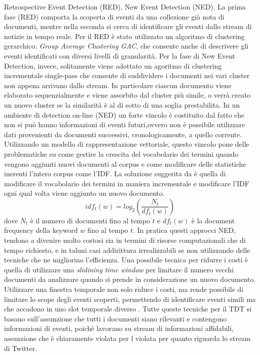 \documentclass[a4paper,12pt]{report}
\begin{document}
Retrospective Event Detection (RED), New Event Detection (NED). La prima fase (RED) comporta la scoperta di eventi da una collezione già nota di documenti, mentre nella seconda si cerca di identificare gli eventi dallo stream di notizie in tempo reale. Per il RED è stato utilizzato un algoritmo di clustering gerarchico: \emph{Group Average Clustering GAC}, che consente anche di descrivere gli eventi identificati con diversi livelli di granularità. Per la fase di New Event Detection, invece, solitamente viene adottato un agoritmo di clustering incrementale single-pass \cite{Allan:2002:TDT:772260,Yang:1998:SRO:290941.290953} che consente di suddividere i documenti nei vari cluster non appena arrivano dallo stream. In particolare ciascun documento viene elaborato sequenzialmente e viene assorbito dal cluster più simile, o verrà creato un nuovo cluster se la similarità è al di sotto di una soglia prestabilita. In un ambiente di detection on-line (NED) un forte vincolo è costituito dal fatto che non si può hanno informazioni di eventi futuri,ovvero non è possibile utilizzare dati provenienti da documenti successivi, cronologicamente, a quello corrente. Utilizzando un modello di rappresentazione vettoriale, questo vincolo pone delle problematiche su come gestire la crescita del vocabolario dei termini quando vengono aggiunti nuovi documenti al corpus e come modificare delle statistiche inerenti l'intero corpus come l'IDF. La soluzione suggerita da  \cite{Yang:1998:SRO:290941.290953} è quella di modificare il vocabolario dei termini in maniera incrementale e modificare l'IDF ogni qual volta viene aggiunto un nuovo documento. 
\begin{equation}
\label{eq:incIDF}
idf_t(w)=log_2 \left(\frac{N_t}{df_t(w)} \right) 
\end{equation}
dove $N_t$ è il numero di documenti fino al tempo $t$ e $df_t(w)$ è la document frequency della keyword $w$ fino al tempo $t$.
In pratica questi approcci NED, tendono a divenire molto costosi sia in termini di risorse computazionali che di tempo richiesto, e in taluni casi addirittura irrealizzabili se non utilizzando delle tecniche che ne migliorino l'efficienza. Una possibile tecnica per ridurre i costi è quella di utilizzare una \emph{slidining time window} \cite{Luo:2007:RRN:1247480.1247536,Papka:1999:ONE:897559} per limitare il numero vecchi documenti da analizzare quando si prende in considerazione un nuovo documento. Utilizzare una finestra temporale non solo riduce i costi, ma rende possibile di limitare lo scope degli eventi scoperti, permettendo di identificare eventi simili ma che accadono in uno slot temporale diverso \cite{Yang:1998:SRO:290941.290953}. Tutte queste tecniche per il TDT si basano sull'assunzione che tutti i documenti siano rilevanti e contengono informazioni di eventi, poichè lavorano su stream di informazioni affidabili,  assunzione che è chiaramente violata per l violata per quanto riguarda lo stream di Twitter.
 
\end{document}
